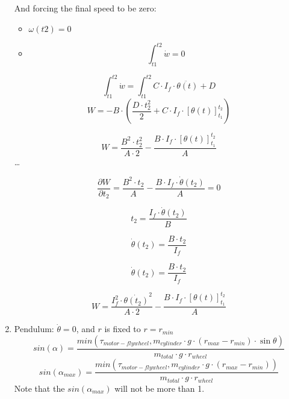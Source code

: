 \begin{enumerate}
    And forcing the final speed to be zero:
    \begin{itemize}
        \item $\omega(t2)=0$
        \item \begin{equation*}
            \int_{t1}^{t2} \dot{w} = 0
        \end{equation*}
    \end{itemize}
    \begin{equation*}
        \int_{t1}^{t2} \dot{w} = \int_{t1}^{t2} C\cdot I_f \cdot \ddot{\theta(t)} + D
    \end{equation*}
    \begin{equation*}
        W=
        -B \cdot (
        \frac{D\cdot t_2^2}{2}+
        C\cdot I_f \cdot [\theta(t)]_{t_1}^{t_2})     
    \end{equation*}

    
    \begin{equation*}
        W=        
        \frac{B^2\cdot t_2^2}{A \cdot 2}-
        \frac{B \cdot I_f \cdot [\theta(t)]_{t_1}^{t_2}}{A}     
    \end{equation*}
    \dots
    
    \begin{equation*}
        \frac{\partial W}{\partial t_2}=        
        \frac{B^2\cdot t_2}{A}-
        \frac{B \cdot I_f \cdot \dot{\theta}(t_2)}{A} = 0     
    \end{equation*}


    \begin{equation*}
        t_2 =
        \frac{I_f \cdot \dot{\theta}(t_2)}{B}     
    \end{equation*}

    \begin{equation*}
        \dot{\theta}(t_2)  =
        \frac{B \cdot t_2}{I_f}     
    \end{equation*}


    \begin{equation*}
        \dot{\theta}(t_2)  =
        \frac{B \cdot t_2}{I_f}     
    \end{equation*}


    \begin{equation*}
        W=        
        \frac{I_f^2\cdot \dot{\theta(t_2)}^2}{A \cdot 2}-
        \frac{B \cdot I_f \cdot [\theta(t)]_{t_1}^{t_2}}{A}     
    \end{equation*}


    \item Pendulum: $\dot{\theta} = 0$, and $r$ is fixed to $r = r_{min}$
    \[sin(\alpha) = \frac{min(\tau_{motor-flywheel},m_{cylinder} \cdot  g \cdot  (r_{max} - r_{min}) \cdot  \sin{\theta})}{m_{total} \cdot  g \cdot  r_{wheel}} \]
    \begin{equation}\label{Maximum angle using pendulum system}
        \boxed{sin(\alpha_{max}) = \frac{min(\tau_{motor-flywheel},m_{cylinder} \cdot  g \cdot  (r_{max} - r_{min}))}{m_{total} \cdot  g \cdot  r_{wheel}}}
    \end{equation}
    Note that the $sin(\alpha_{max})$ will not be more than 1.
\end{enumerate}
